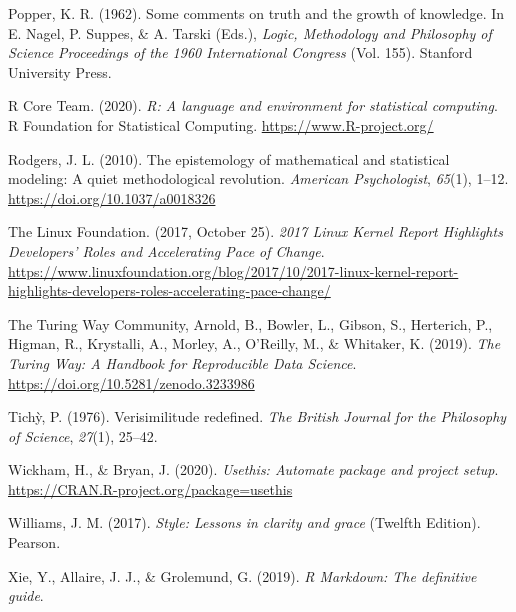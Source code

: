 \documentclass[12pt,a4paper,]{article}
\begin{document}
\leavevmode\hypertarget{ref-popperCommentsTruthGrowth1962}{}%
Popper, K. R. (1962). Some comments on truth and the growth of knowledge. In E. Nagel, P. Suppes, \& A. Tarski (Eds.), \emph{Logic, Methodology and Philosophy of Science Proceedings of the 1960 International Congress} (Vol. 155). Stanford University Press.

\leavevmode\hypertarget{ref-R-base}{}%
R Core Team. (2020). \emph{R: A language and environment for statistical computing}. R Foundation for Statistical Computing. \url{https://www.R-project.org/}

\leavevmode\hypertarget{ref-rodgersEpistemologyMathematicalStatistical2010}{}%
Rodgers, J. L. (2010). The epistemology of mathematical and statistical modeling: A quiet methodological revolution. \emph{American Psychologist}, \emph{65}(1), 1--12. \url{https://doi.org/10.1037/a0018326}

\leavevmode\hypertarget{ref-thelinuxfoundation2017LinuxKernel2017}{}%
The Linux Foundation. (2017, October 25). \emph{2017 Linux Kernel Report Highlights Developers' Roles and Accelerating Pace of Change}. \url{https://www.linuxfoundation.org/blog/2017/10/2017-linux-kernel-report-highlights-developers-roles-accelerating-pace-change/}

\leavevmode\hypertarget{ref-theturingwaycommunityTuringWayHandbook2019}{}%
The Turing Way Community, Arnold, B., Bowler, L., Gibson, S., Herterich, P., Higman, R., Krystalli, A., Morley, A., O'Reilly, M., \& Whitaker, K. (2019). \emph{The Turing Way: A Handbook for Reproducible Data Science}. \url{https://doi.org/10.5281/zenodo.3233986}

\leavevmode\hypertarget{ref-tichyVerisimilitudeRedefined1976}{}%
Tichỳ, P. (1976). Verisimilitude redefined. \emph{The British Journal for the Philosophy of Science}, \emph{27}(1), 25--42.

\leavevmode\hypertarget{ref-R-usethis}{}%
Wickham, H., \& Bryan, J. (2020). \emph{Usethis: Automate package and project setup}. \url{https://CRAN.R-project.org/package=usethis}

\leavevmode\hypertarget{ref-williamsStyleLessonsClarity2017}{}%
Williams, J. M. (2017). \emph{Style: Lessons in clarity and grace} (Twelfth Edition). Pearson.

\leavevmode\hypertarget{ref-xieMarkdownDefinitiveGuide2019}{}%
Xie, Y., Allaire, J. J., \& Grolemund, G. (2019). \emph{R Markdown: The definitive guide}.
\end{document}
